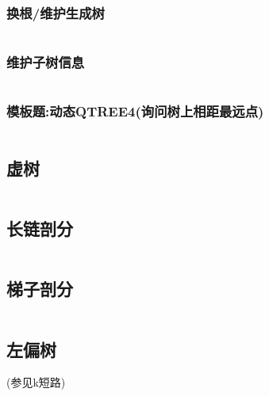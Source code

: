 \documentclass[a4paper]{article}
\begin{document}
\begin{multicols}{2}
					\subsubsection{换根/维护生成树}
						\inputminted{cpp}{../src/datastructure/LCT(换根).cpp}

					\subsubsection{维护子树信息}
						\inputminted{cpp}{../src/datastructure/LCT维护子树信息.cpp}
					
					\subsubsection{模板题:动态QTREE4(询问树上相距最远点)}
						\inputminted{cpp}{../src/datastructure/动态QTREE4.cpp}






				\subsection{虚树}
					\inputminted{cpp}{../src/datastructure/虚树.cpp}


				\subsection{长链剖分}
					\inputminted{cpp}{../src/datastructure/长链剖分.cpp}

				\subsection{梯子剖分}
					\inputminted{cpp}{../src/datastructure/梯子剖分.cpp}
				
				\subsection{左偏树}
					(参见k短路)


\end{multicols}
\end{document}
